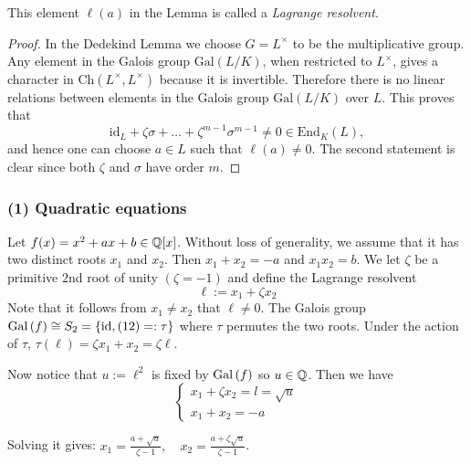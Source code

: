 \documentclass[twoside = false,	%
		headsepline,		%
		parskip = true,
		]{scrbook}						%
\begin{document}
    This element $\ell(a)$ in the Lemma is called a \emph{Lagrange resolvent}.

    \begin{proof}
        In the Dedekind Lemma we choose $G=L^\times$ to be the multiplicative group. Any element in the Galois group $\mathrm{Gal}(L/K)$, when restricted to $L^\times$, gives a character in $\mathrm{Ch}(L^\times,L^\times)$ because it is invertible. Therefore there is no linear relations between elements in the Galois group $\mathrm{Gal}(L/K)$ over $L$. This proves that $$\mathrm{id}_L+\zeta\sigma+\ldots+\zeta^{m-1}\sigma^{m-1}\neq 0\in \mathrm{End}_K(L),$$
        and hence one can choose $a\in L$ such that $\ell(a)\neq 0$. The second statement is clear since both $\zeta$ and $\sigma$ have order $m$.
    \end{proof}

        \subsubsection{(1) Quadratic equations} 
            Let $f(x) = x^2 + ax + b \in \mathbb Q[x]$. Without loss of generality, we assume that it has two distinct roots $x_1$ and $x_2$. Then $x_1 + x_2 = -a$ and $x_1x_2 = b$. We let $\zeta$ be a primitive $2$nd root of unity $(\zeta = -1)$ and define the Lagrange resolvent
            \begin{equation*}
                \ell := x_1 + \zeta x_2
            \end{equation*}
            Note that it follows from $x_1\neq x_2$ that $\ell\neq 0$.
            The Galois group $\mathrm{Gal}\left( f\right) \cong S_2 = \{\mathrm{id}, (12)=: \tau \}$ where $\tau$ permutes the two roots. Under the action of $\tau$, $\tau(\ell) = \zeta x_1 + x_2 = \zeta \ell$.
            
            Now notice that $u:= \ell^2$ is fixed by $\mathrm{Gal}\left( f\right)$ so $u \in \mathbb Q$. Then we have
            \begin{equation*}
                \left\{ \begin{array}{c}
                    x_1 + \zeta x_2 = l = \sqrt{u}  \\
                    x_1 + x_2 = -a
                \end{array}\right.
            \end{equation*}
            
            Solving it gives: $x_1 = \frac{a + \sqrt{u}}{\zeta - 1}, \quad x_2 = \frac{a +\zeta \sqrt{u}}{\zeta - 1}$.
            
\end{document}

